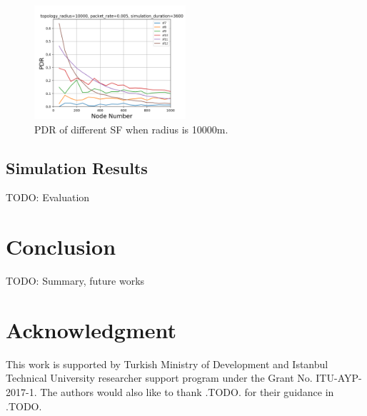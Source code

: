 \documentclass[conference]{IEEEtran}
\begin{document}
\begin{figure}
\centering
\includegraphics[width=0.5\textwidth]{sf_10000}
\caption{PDR of different SF when radius is 10000m.}
\label{fig:sf_10000}
\end{figure}

\subsection{Simulation Results}
TODO: Evaluation


\section{Conclusion}
TODO: Summary, future works
\cite{7815384} \cite{7803607} \cite{7996384} \cite{8090518} \cite{s17061193} \cite{8267219} \cite{8430542} \cite{8319183} \cite{8480649} \cite{AN1200.22} \cite{Bor:2016:LLW:2988287.2989163} \cite{8406255} \cite{DBLP:journals/corr/abs-1802-10338} \cite{finnegan2018comparative}


\section*{Acknowledgment}
This work is supported by Turkish Ministry of Development and Istanbul Technical University researcher support program under the Grant No. ITU-AYP-2017-1. The authors would also like to thank .TODO. for their guidance in .TODO.




\end{document}
